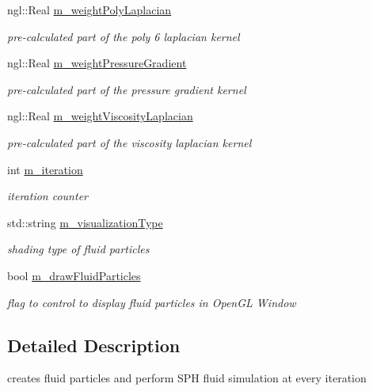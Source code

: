 \begin{DoxyCompactItemize}
ngl::Real \hyperlink{class_s_p_h_solver_a76b956a2ddc98d9055438a0b57edba15}{m\_\-weightPolyLaplacian}
\begin{DoxyCompactList}\small\item\em pre-\/calculated part of the poly 6 laplacian kernel \item\end{DoxyCompactList}\item 
ngl::Real \hyperlink{class_s_p_h_solver_a69a9cc39ecf773ca645afd281794cf9a}{m\_\-weightPressureGradient}
\begin{DoxyCompactList}\small\item\em pre-\/calculated part of the pressure gradient kernel \item\end{DoxyCompactList}\item 
ngl::Real \hyperlink{class_s_p_h_solver_a7c059675a5ca3fec7f4bf7e59d19f5ab}{m\_\-weightViscosityLaplacian}
\begin{DoxyCompactList}\small\item\em pre-\/calculated part of the viscosity laplacian kernel \item\end{DoxyCompactList}\item 
int \hyperlink{class_s_p_h_solver_ad168b241193a5a34b33553cbd8a26c6f}{m\_\-iteration}
\begin{DoxyCompactList}\small\item\em iteration counter \item\end{DoxyCompactList}\item 
std::string \hyperlink{class_s_p_h_solver_a60c10a0a436f307626d3422fb05809ce}{m\_\-visualizationType}
\begin{DoxyCompactList}\small\item\em shading type of fluid particles \item\end{DoxyCompactList}\item 
bool \hyperlink{class_s_p_h_solver_a67a0ab46b9a3105400546a758ac6f2d1}{m\_\-drawFluidParticles}
\begin{DoxyCompactList}\small\item\em flag to control to display fluid particles in OpenGL Window \item\end{DoxyCompactList}\end{DoxyCompactItemize}


\subsection{Detailed Description}
creates fluid particles and perform SPH fluid simulation at every iteration 

